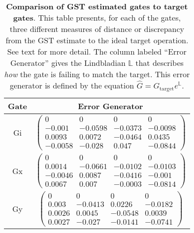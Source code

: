 {\begin{table}[h]
\begin{center}
\vspace{2em}
\begin{tabular}[l]{|c|c|}
\hline
Gate & Error Generator \\ \hline
Gi & $ \left(\!\!\begin{array}{cccc}
0 & 0 & 0 & 0 \\ 
-0.001 & -0.0598 & -0.0373 & -0.0098 \\ 
0.0093 & 0.0072 & -0.0464 & 0.0435 \\ 
-0.0058 & -0.028 & 0.047 & -0.0844
 \end{array}\!\!\right) $
 \\ \hline
Gx & $ \left(\!\!\begin{array}{cccc}
0 & 0 & 0 & 0 \\ 
0.0014 & -0.0661 & -0.0102 & -0.0103 \\ 
-0.0046 & 0.0087 & -0.0416 & -0.001 \\ 
0.0067 & 0.007 & -0.0003 & -0.0814
 \end{array}\!\!\right) $
 \\ \hline
Gy & $ \left(\!\!\begin{array}{cccc}
0 & 0 & 0 & 0 \\ 
0.003 & -0.0413 & 0.0226 & -0.0182 \\ 
0.0026 & 0.0045 & -0.0548 & 0.0039 \\ 
0.0027 & -0.027 & -0.0141 & -0.0741
 \end{array}\!\!\right) $
 \\ \hline
\end{tabular}

\caption{\textbf{Comparison of GST estimated gates to target gates}.  This table presents, for each of the gates, three different measures of distance or discrepancy from the GST estimate to the ideal target operation.  See text for more detail.  The column labeled ``Error Generator'' gives the Lindbladian $\mathbb{L}$ that describes \emph{how} the gate is failing to match the target.  This error generator is defined by the equation $\hat{G} = G_{\mathrm{target}}e^{\mathbb{L}}$. \label{bestCPTPGatesetVsTargetTable}}
\end{center}
\end{table}

}
